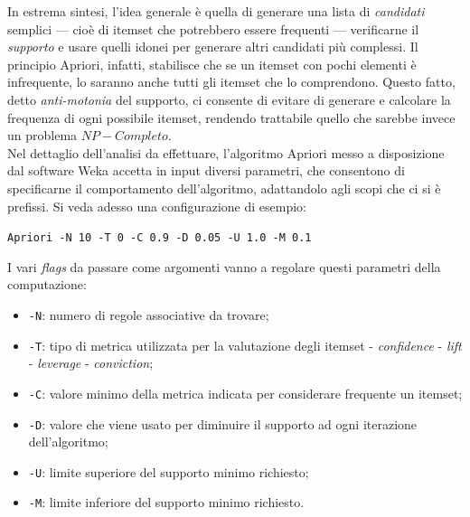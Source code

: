         In estrema sintesi, l'idea generale è quella di generare una lista di \textit{candidati} semplici --- cioè di itemset che potrebbero essere frequenti --- verificarne il \textit{supporto} e usare quelli idonei per generare altri candidati più complessi. Il principio Apriori, infatti, stabilisce che se un itemset con pochi elementi è infrequente, lo saranno anche tutti gli itemset che lo comprendono. Questo fatto, detto \textit{anti-motonia} del supporto, ci consente di evitare di generare e calcolare la frequenza di ogni possibile itemset, rendendo trattabile quello che sarebbe invece un problema $NP-Completo$. \\

        Nel dettaglio dell'analisi da effettuare, l'algoritmo Apriori messo a disposizione dal software Weka accetta in input diversi parametri, che consentono di specificarne il comportamento dell'algoritmo, adattandolo agli scopi che ci si è prefissi. Si veda adesso una configurazione di esempio:\\

        \begin{center}
            \noindent \texttt{Apriori -N 10 -T 0 -C 0.9 -D 0.05 -U 1.0 -M 0.1}
        \end{center}

        I vari \textit{flags} da passare come argomenti vanno a regolare questi parametri della computazione:

        \begin{itemize}
            \item \texttt{-N}: numero di regole associative da trovare;
            \item \texttt{-T}: tipo di metrica utilizzata per la valutazione degli itemset
                 - \textit{confidence}
                 - \textit{lift}
                 - \textit{leverage}
                 - \textit{conviction};
            \item \texttt{-C}: valore minimo della metrica indicata per considerare frequente un itemset;
            \item \texttt{-D}: valore che viene usato per diminuire il supporto ad ogni iterazione dell'algoritmo;
            \item \texttt{-U}: limite superiore del supporto minimo richiesto;
            \item \texttt{-M}: limite inferiore del supporto minimo richiesto.
        \end{itemize}

